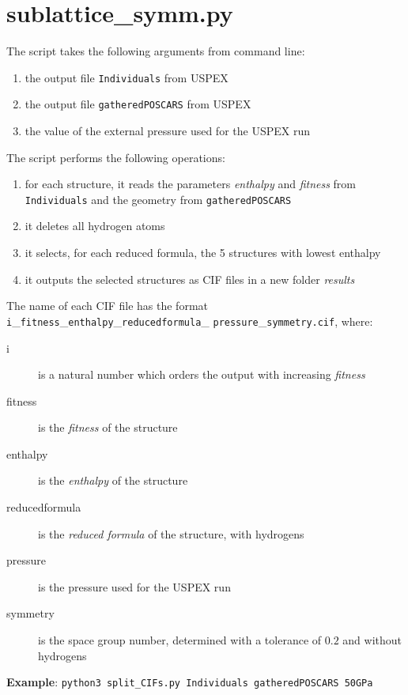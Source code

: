 \documentclass{article}
\begin{document}
\vspace{1cm}
\section{sublattice\_symm.py}
The script takes the following arguments from command line:
\begin{enumerate}
	\item the output file \texttt{Individuals} from USPEX
	\item the output file \texttt{gatheredPOSCARS} from USPEX
	\item the value of the external pressure used for the USPEX run
\end{enumerate}
The script performs the following operations:
\begin{enumerate}
	\item for each structure, it reads the parameters \emph{enthalpy} and \emph{fitness} from \texttt{Individuals} and the geometry from \texttt{gatheredPOSCARS}
	\item it deletes all hydrogen atoms
	\item it selects, for each reduced formula, the 5 structures with lowest enthalpy
	\item it outputs the selected structures as CIF files in a new folder \textit{results}
\end{enumerate}
The name of each CIF file has the format \texttt{i}\_\texttt{fitness}\_\texttt{enthalpy}\_\texttt{reducedformula}\_ \texttt{pressure}\_\texttt{symmetry.cif}, where:
\begin{description}
	\item[i] is a natural number which orders the output with increasing \emph{fitness}
	\item[fitness] is the \emph{fitness} of the structure
	\item[enthalpy] is the \emph{enthalpy} of the structure
	\item[reducedformula] is the \emph{reduced formula} of the structure, with hydrogens
	\item[pressure] is the pressure used for the USPEX run
	\item[symmetry] is the space group number, determined with a tolerance of $0.2$ and without hydrogens
\end{description}
\textbf{Example}: \texttt{python3 split\_CIFs.py Individuals gatheredPOSCARS 50GPa}

\vspace{1cm}
\end{document}
